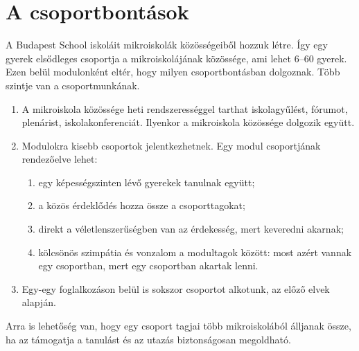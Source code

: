 \section{A csoportbontások}
\label{sec:csoportok}

A Budapest School iskoláit mikroiskolák közösségeiből hozzuk létre. Így egy gyerek elsődleges csoportja a mikroiskolájának közössége, ami lehet 6--60  gyerek. Ezen belül modulonként eltér, hogy milyen csoportbontásban dolgoznak. Több szintje van a csoportmunkának.
\begin{enumerate}
      \item A mikroiskola közössége heti rendszerességgel tarthat iskolagyűlést, fórumot, plenárist, iskolakonferenciát. Ilyenkor a mikroiskola közössége dolgozik együtt.
      \item  Modulokra kisebb csoportok jelentkezhetnek. Egy modul csoportjának rendezőelve lehet:
            \begin{enumerate}
                  \item egy képességszinten lévő gyerekek tanulnak együtt;
                  \item a közös érdeklődés hozza össze a csoporttagokat;
                  \item  direkt a véletlenszerűségben van az érdekesség, mert keveredni akarnak;
                  \item kölcsönös szimpátia és vonzalom a modultagok között: most azért vannak egy csoportban, mert egy csoportban akartak lenni.
            \end{enumerate}
      \item  Egy-egy foglalkozáson belül is sokszor csoportot alkotunk, az előző elvek alapján.

\end{enumerate}

Arra is lehetőség van, hogy egy csoport tagjai több mikroiskolából álljanak össze, ha az támogatja a tanulást és az utazás biztonságosan megoldható.